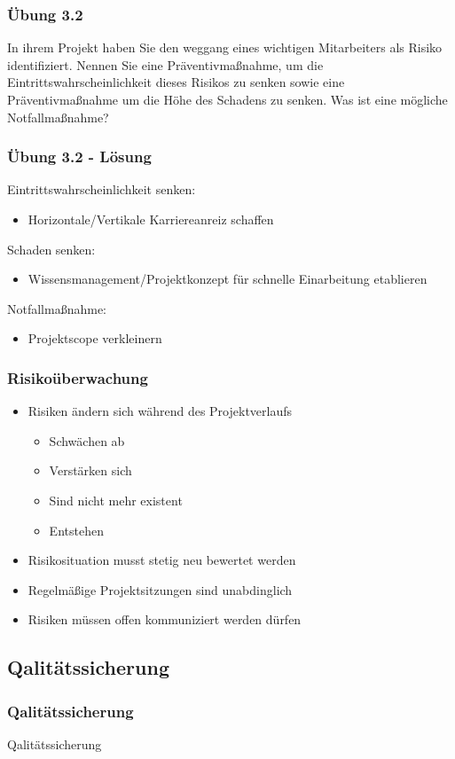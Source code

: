 \begin{frame}
\frametitle{Übung 3.2}
	In ihrem Projekt haben Sie den weggang eines wichtigen Mitarbeiters als Risiko identifiziert.
	Nennen Sie eine Präventivmaßnahme, um die Eintrittswahrscheinlichkeit dieses Risikos zu senken
	sowie eine Präventivmaßnahme um die Höhe des Schadens zu senken. Was ist eine mögliche
	Notfallmaßnahme?
\end{frame}

\ifloesung
\begin{frame}
\frametitle{Übung 3.2 - Lösung}
	Eintrittswahrscheinlichkeit senken:
	\begin{itemize}
		\item Horizontale/Vertikale Karriereanreiz schaffen
	\end{itemize}

	Schaden senken:
	\begin{itemize}
		\item Wissensmanagement/Projektkonzept für schnelle Einarbeitung etablieren
	\end{itemize}

	Notfallmaßnahme:
	\begin{itemize}
		\item Projektscope verkleinern
	\end{itemize}
\end{frame}
\fi

\begin{frame}
\frametitle{Risikoüberwachung}
	\begin{itemize}
		\item Risiken ändern sich während des Projektverlaufs
					\begin{itemize}
						\item Schwächen ab
						\item Verstärken sich
						\item Sind nicht mehr existent
						\item Entstehen
					\end{itemize}
		\item Risikosituation musst stetig neu bewertet werden
		\item Regelmäßige Projektsitzungen sind unabdinglich
		\item Risiken müssen offen kommuniziert werden dürfen
	\end{itemize}
\end{frame}

\subsection{Qalitätssicherung}
\begin{frame}
\frametitle{Qalitätssicherung}
\huge Qalitätssicherung
\end{frame}

